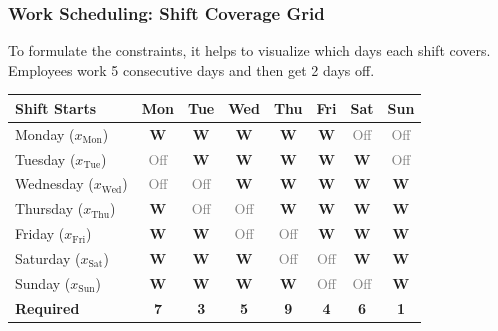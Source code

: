 \documentclass{beamer}
\begin{document}
\begin{frame}
\frametitle{Work Scheduling: Shift Coverage Grid}
To formulate the constraints, it helps to visualize which days each shift covers. Employees work 5 consecutive days and then get 2 days off.

\vspace{0.3cm}
\begin{center}
\renewcommand{\arraystretch}{1.3}
\begin{tabular}{|l|c|c|c|c|c|c|c|}
\hline
\textbf{Shift Starts} & \textbf{Mon} & \textbf{Tue} & \textbf{Wed} & \textbf{Thu} & \textbf{Fri} & \textbf{Sat} & \textbf{Sun} \\
\hline
Monday (\(x_{\text{Mon}}\)) & \textcolor{green!60!black}{\textbf{W}} & \textcolor{green!60!black}{\textbf{W}} & \textcolor{green!60!black}{\textbf{W}} & \textcolor{green!60!black}{\textbf{W}} & \textcolor{green!60!black}{\textbf{W}} & \textcolor{gray}{Off} & \textcolor{gray}{Off} \\
Tuesday (\(x_{\text{Tue}}\)) & \textcolor{gray}{Off} & \textcolor{green!60!black}{\textbf{W}} & \textcolor{green!60!black}{\textbf{W}} & \textcolor{green!60!black}{\textbf{W}} & \textcolor{green!60!black}{\textbf{W}} & \textcolor{green!60!black}{\textbf{W}} & \textcolor{gray}{Off} \\
Wednesday (\(x_{\text{Wed}}\)) & \textcolor{gray}{Off} & \textcolor{gray}{Off} & \textcolor{green!60!black}{\textbf{W}} & \textcolor{green!60!black}{\textbf{W}} & \textcolor{green!60!black}{\textbf{W}} & \textcolor{green!60!black}{\textbf{W}} & \textcolor{green!60!black}{\textbf{W}} \\
Thursday (\(x_{\text{Thu}}\)) & \textcolor{green!60!black}{\textbf{W}} & \textcolor{gray}{Off} & \textcolor{gray}{Off} & \textcolor{green!60!black}{\textbf{W}} & \textcolor{green!60!black}{\textbf{W}} & \textcolor{green!60!black}{\textbf{W}} & \textcolor{green!60!black}{\textbf{W}} \\
Friday (\(x_{\text{Fri}}\)) & \textcolor{green!60!black}{\textbf{W}} & \textcolor{green!60!black}{\textbf{W}} & \textcolor{gray}{Off} & \textcolor{gray}{Off} & \textcolor{green!60!black}{\textbf{W}} & \textcolor{green!60!black}{\textbf{W}} & \textcolor{green!60!black}{\textbf{W}} \\
Saturday (\(x_{\text{Sat}}\)) & \textcolor{green!60!black}{\textbf{W}} & \textcolor{green!60!black}{\textbf{W}} & \textcolor{green!60!black}{\textbf{W}} & \textcolor{gray}{Off} & \textcolor{gray}{Off} & \textcolor{green!60!black}{\textbf{W}} & \textcolor{green!60!black}{\textbf{W}} \\
Sunday (\(x_{\text{Sun}}\)) & \textcolor{green!60!black}{\textbf{W}} & \textcolor{green!60!black}{\textbf{W}} & \textcolor{green!60!black}{\textbf{W}} & \textcolor{green!60!black}{\textbf{W}} & \textcolor{gray}{Off} & \textcolor{gray}{Off} & \textcolor{green!60!black}{\textbf{W}} \\
\hline
\textbf{Required} & \textbf{7} & \textbf{3} & \textbf{5} & \textbf{9} & \textbf{4} & \textbf{6} & \textbf{1} \\
\hline
\end{tabular}
\end{center}
\end{frame}
\end{document}
